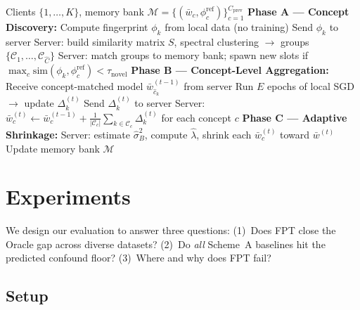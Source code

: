\documentclass[11pt]{article}
\newcommand{\cC}{\mathcal{C}}
\newcommand{\wbar}{\bar{w}}
\begin{document}
\begin{algorithm}[t]
\caption{FedProTrack: One Federation Round}
\label{alg:fpt}
\begin{algorithmic}[1]
\REQUIRE Clients $\{1,\ldots,K\}$, memory bank $\mathcal{M} = \{(\wbar_c, \phi_c^{\mathrm{ref}})\}_{c=1}^{C_{\mathrm{prev}}}$
\STATE \textbf{Phase A --- Concept Discovery:}
    \STATE Compute fingerprint $\phi_k$ from local data (no training)
    \STATE Send $\phi_k$ to server
\ENDFOR
\STATE Server: build similarity matrix $S$, spectral clustering $\to$ groups $\{\cC_1, \ldots, \cC_{\hat C}\}$
\STATE Server: match groups to memory bank; spawn new slots if $\max_c \mathrm{sim}(\phi_k, \phi_c^{\mathrm{ref}}) < \tau_{\mathrm{novel}}$
\STATE \textbf{Phase B --- Concept-Level Aggregation:}
    \STATE Receive concept-matched model $\wbar_{\hat c_k}^{(t-1)}$ from server
    \STATE Run $E$ epochs of local SGD $\to$ update $\Delta_k^{(t)}$
    \STATE Send $\Delta_k^{(t)}$ to server
\ENDFOR
\STATE Server: $\wbar_c^{(t)} \leftarrow \wbar_c^{(t-1)} + \frac{1}{|\cC_c|}\sum_{k \in \cC_c} \Delta_k^{(t)}$ for each concept $c$
\STATE \textbf{Phase C --- Adaptive Shrinkage:}
\STATE Server: estimate $\hat\sigma_B^2$, compute $\hat\lambda$, shrink each $\wbar_c^{(t)}$ toward $\wbar^{(t)}$
\STATE Update memory bank $\mathcal{M}$
\end{algorithmic}
\end{algorithm}


\section{Experiments}
\label{sec:experiments}

We design our evaluation to answer three questions: (1)~Does FPT close the Oracle gap across diverse datasets? (2)~Do \emph{all} Scheme~A baselines hit the predicted confound floor? (3)~Where and why does FPT fail?

\subsection{Setup}
\end{document}
